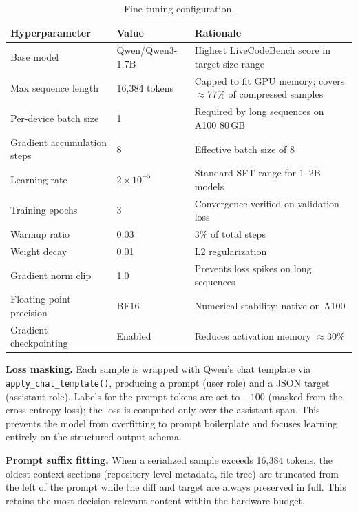\documentclass[11pt]{article}
\begin{document}
\begin{table}[H]
\centering
\caption{Fine-tuning configuration.}
\label{tab:finetune_config}
\begin{tabular}{@{}p{5.5cm}p{3cm}p{5.5cm}@{}}
\toprule
\textbf{Hyperparameter} & \textbf{Value} & \textbf{Rationale} \\ \midrule
Base model & Qwen/Qwen3-1.7B & Highest LiveCodeBench score in target size range \\ \midrule
Max sequence length & 16,384 tokens & Capped to fit GPU memory; covers $\approx$77\% of compressed samples \\ \midrule
Per-device batch size & 1 & Required by long sequences on A100 80\,GB \\ \midrule
Gradient accumulation steps & 8 & Effective batch size of 8 \\ \midrule
Learning rate & $2 \times 10^{-5}$ & Standard SFT range for 1--2B models \\ \midrule
Training epochs & 3 & Convergence verified on validation loss \\ \midrule
Warmup ratio & 0.03 & 3\% of total steps \\ \midrule
Weight decay & 0.01 & L2 regularization \\ \midrule
Gradient norm clip & 1.0 & Prevents loss spikes on long sequences \\ \midrule
Floating-point precision & BF16 & Numerical stability; native on A100 \\ \midrule
Gradient checkpointing & Enabled & Reduces activation memory $\approx$30\% \\ \bottomrule
\end{tabular}
\end{table}

\textbf{Loss masking.} Each sample is wrapped with Qwen's chat template via \texttt{apply\_chat\_template()}, producing a prompt (user role) and a JSON target (assistant role). Labels for the prompt tokens are set to $-100$ (masked from the cross-entropy loss); the loss is computed only over the assistant span. This prevents the model from overfitting to prompt boilerplate and focuses learning entirely on the structured output schema.

\textbf{Prompt suffix fitting.} When a serialized sample exceeds 16,384 tokens, the oldest context sections (repository-level metadata, file tree) are truncated from the left of the prompt while the diff and target are always preserved in full. This retains the most decision-relevant content within the hardware budget.
\end{document}
